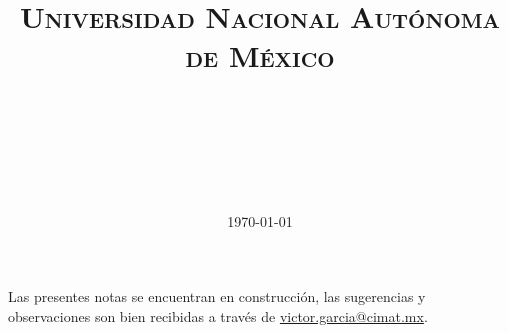 \documentclass[paper=a4, fontsize=11pt]{scrartcl}
\title{
\normalfont\normalsize
\textsc{Universidad Nacional Autónoma de México} \\[25pt]
\horrule{0.5pt} \\[0.4cm]
\huge \titulo\\[25pt]
\horrule{2pt} \\[0.5cm]
}
\author{\autor}
\date{\normalsize\today}
\numberwithin{equation}{subsection}
\numberwithin{figure}{subsection}
\numberwithin{table}{subsection}
\theoremstyle{definition}
\begin{document}


Las presentes notas se encuentran en construcción, las sugerencias y observaciones son bien recibidas a través de \url{victor.garcia@cimat.mx}.











%



\end{document}
